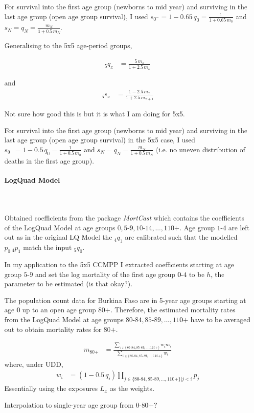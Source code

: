 \documentclass[12pt,a4paper]{article}
\begin{document}
For survival into the first age group (newborns to mid year) and surviving in the last age group (open age group survival), I used $s_{0^{-}} = 1 - 0.65 \, q_0 = \frac{1}{1+ 0.65 \, m_0}$ and $s_N = q_N = \frac{m_N}{1+0.5 \, m_N}$.

\newpage
Generalising to the 5x5 age-period groups,

\begin{align*}
_5q_x &= \frac{5 \, m_x}{1+ 2.5 \, m_x}
\end{align*}

and
\begin{align*}
 _5s_x &=  \frac{1 - 2.5 \, m_x}{1 + 2.5 \, m_{x+1}}
\end{align*}

Not sure how good this is but it is what I am doing for 5x5.

For survival into the first age group (newborns to mid year) and surviving in the last age group (open age group survival) in the 5x5 case, I used $s_{0^{-}} = 1 - 0.5 \, q_0 = \frac{1}{1+ 0.5 \, m_0}$ and $s_N = q_N = \frac{m_N}{1+0.5 \, m_N}$ (i.e. no uneven distribution of deaths in the first age group).
 
\paragraph{LogQuad Model} \\~\\
Obtained coefficients from the package \textit{MortCast} which contains the coefficients of the LogQuad Model at age groups $0, 5\text{-}9, 10\text{-}14, \dots, 110\text{+}$. Age group $1\text{-}4$ are left out as in the original LQ Model the $_4q_1$ are calibrated such that the modelled $p_0 \, _4p_1$ match the input $_5q_0$. 

In my application to the 5x5 CCMPP I extracted coefficients starting at age group $5\text{-}9$ and set the log mortality of the first age group $0\text{-}4$ to be $h$, the parameter to be estimated (is that okay?).

The population count data for Burkina Faso are in 5-year age groups starting at age 0 up to an open age group $80\text{+}$. Therefore, the estimated mortality rates from the LogQuad Model at age groups $80\text{-}84, 85\text{-}89, \dots, 110\text{+}$ have to be averaged out to obtain mortality rates for $80\text{+}$.

\begin{align*}
m_{80\text{+}} &= \frac{\sum_{i \in \{80\text{-}84, 85\text{-}89, \dots, 110\text{+} \}} w_i m_i }{\sum_{i \in \{80\text{-}84, 85\text{-}89, \dots, 110\text{+} \}} w_i}
\end{align*}
where, under UDD,
\begin{align*}
w_i &= (1-0.5 \, q_i) \prod_{j \in \{80\text{-}84, 85\text{-}89, \dots, 110\text{+} \} \vert j < i} p_j
\end{align*}
Essentially using the exposures $L_x$ as the weights.

Interpolation to single-year age group from $0\text{-}80\text{+}$?
\end{document}
